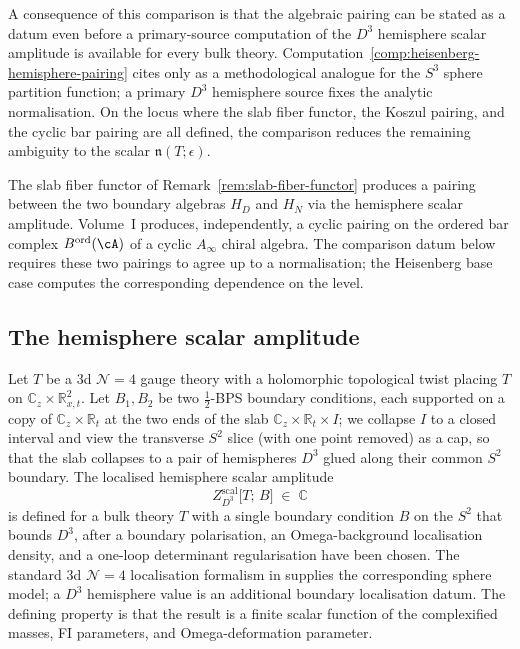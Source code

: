 A consequence of this comparison is that the algebraic pairing
can be stated as a datum even before a primary-source computation
of the $D^3$ hemisphere scalar amplitude is available for every
bulk theory. Computation~\ref{comp:heisenberg-hemisphere-pairing}
cites \cite{DFPY16} only as a methodological analogue for the $S^3$
sphere partition function; a primary $D^3$ hemisphere source fixes
the analytic normalisation. On the locus where the slab
fiber functor, the Koszul pairing, and the cyclic bar pairing are all
defined, the comparison reduces the remaining ambiguity to the scalar
$\mathfrak n(T;\epsilon)$.

The slab fiber functor of
Remark~\ref{rem:slab-fiber-functor} produces a pairing between
the two boundary algebras $H_D$ and $H_N$ via the hemisphere
scalar amplitude. Volume~I produces, independently, a cyclic
pairing on the ordered bar complex $B^{\mathrm{ord}}(\cA)$ of a
cyclic $A_\infty$ chiral algebra. The comparison datum below
requires these two pairings to agree up to a normalisation; the
Heisenberg base case computes the corresponding dependence on the
level.

\subsection{The hemisphere scalar amplitude}
\label{subsec:hemisphere-scalar-amplitude}

Let $T$ be a $3$d $\mathcal N=4$ gauge theory with a holomorphic
topological twist placing $T$ on
$\mathbb C_z \times \mathbb R^2_{x,t}$. Let $B_1, B_2$ be two
$\tfrac12$-BPS boundary conditions, each supported on a copy of
$\mathbb C_z \times \mathbb R_t$ at the two ends of the slab
$\mathbb C_z \times \mathbb R_t \times I$; we collapse $I$ to a
closed interval and view the transverse $S^2$ slice (with one
point removed) as a cap, so that the slab collapses to a pair of
hemispheres $D^3$ glued along their common $S^2$ boundary. The
localised hemisphere scalar amplitude
\[
 Z_{D^3}^{\mathrm{scal}}\bigl[T;\, B\bigr]
 \;\in\; \mathbb C
\]
is defined for a bulk theory $T$ with a single boundary
condition $B$ on the $S^2$ that bounds $D^3$, after a boundary
polarisation, an Omega-background localisation density, and a
one-loop determinant regularisation have been chosen. The
standard $3$d $\mathcal N=4$ localisation formalism in
\cite{DFPY16} supplies the corresponding sphere model; a $D^3$
hemisphere value is an additional boundary localisation datum.
The defining property is that the result is a finite scalar
function of the complexified masses, FI parameters, and
Omega-deformation parameter.

